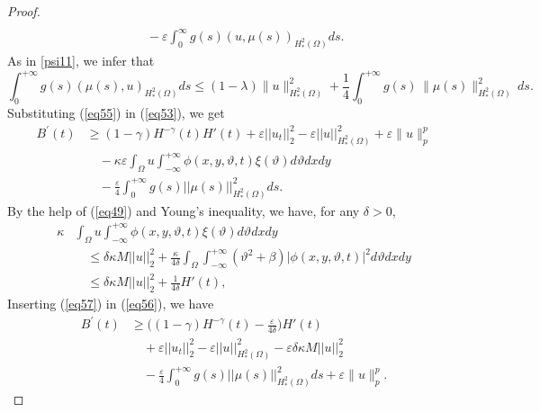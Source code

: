 \documentclass[10pt,a4paper]{amsart}
\begin{document}
\begin{proof}
\begin{equation}
\begin{split}
\\
&\quad -\varepsilon \displaystyle\int_{0}^{\infty} g(s) (u, \mu(s))_{H^2_{*}(\Omega)} ds.
\end{split}
\label{eq53}
\end{equation}
As in \eqref{psi11}, we infer that
\begin{equation}\label{eq55}
\int_{0}^{+\infty} g(s) ( \mu(s), u)_{H_*^{2}(\Omega)}ds\le (1-\lambda)\|u\|^2_{H^2_*(\Omega)}
  + \frac{1}{4}\int_{0}^{+\infty} g(s)\,\|\mu(s)\|_{H_*^{2}(\Omega)}^{2}\,ds.
\end{equation}
Substituting (\ref{eq55}) in (\ref{eq53}), we get
\begin{equation}
\begin{split}
B^{\prime}(t)
& \geq (1-\gamma) H^{-\gamma} (t)  H' (t)+ \varepsilon ||u_t||_2^2 -\varepsilon ||u||^2_{H_*^{2}(\Omega)}+\varepsilon\|u\|_{p}^{p}
\\
&\quad -\kappa\varepsilon  \int_\Omega u \int_{-\infty}^{+\infty}  \phi(x,y,\vartheta,t)\xi (\vartheta) d\vartheta dx dy
\\
&\quad -\frac{\varepsilon}{4} \int_{0}^{+\infty} g(s) ||\mu(s)||^2_{H^2_{*}(\Omega)} ds.
\end{split}
\label{eq56}
\end{equation}
By the help of (\ref{eq49}) and Young's inequality, we have, for any $\delta > 0$,
\begin{equation}
\begin{split}
\kappa
& \int_\Omega u \int_{-\infty}^{+\infty}  \phi(x,y,\vartheta,t)\xi (\vartheta) d\vartheta dx dy
\\
&\quad \leq \delta \kappa M ||u||_2^2 + \frac{\kappa}{4\delta}  \int_\Omega \int_{-\infty}^{+\infty} (\vartheta^2 + \beta) |\phi (x,y,\vartheta,t)|^2 d\vartheta dx dy
\\
&\quad \leq \delta \kappa M ||u||_2^2 + \frac{1}{4\delta} H'(t),
\end{split}
\label{eq57}
\end{equation}
Inserting (\ref{eq57}) in (\ref{eq56}), we have
\begin{equation}
\begin{split}
B^{\prime}(t)
& \geq \biggl( (1-\gamma) H^{-\gamma}(t) - \frac{\varepsilon}{4\delta} \biggl)  H' (t)
\\
&\quad + \varepsilon ||u_t||_2^2 - \varepsilon ||u||^2_{H^2_{*}(\Omega)} - \varepsilon \delta \kappa M ||u||_2^2
\\
&\quad - \frac{\varepsilon}{4} \int_{0}^{+\infty} g(s) ||\mu(s)||^2_{H^2_{*}(\Omega)} ds+\varepsilon\|u\|_{p}^{p}.

\end{split}
\end{equation}
\end{proof}
\end{document}
